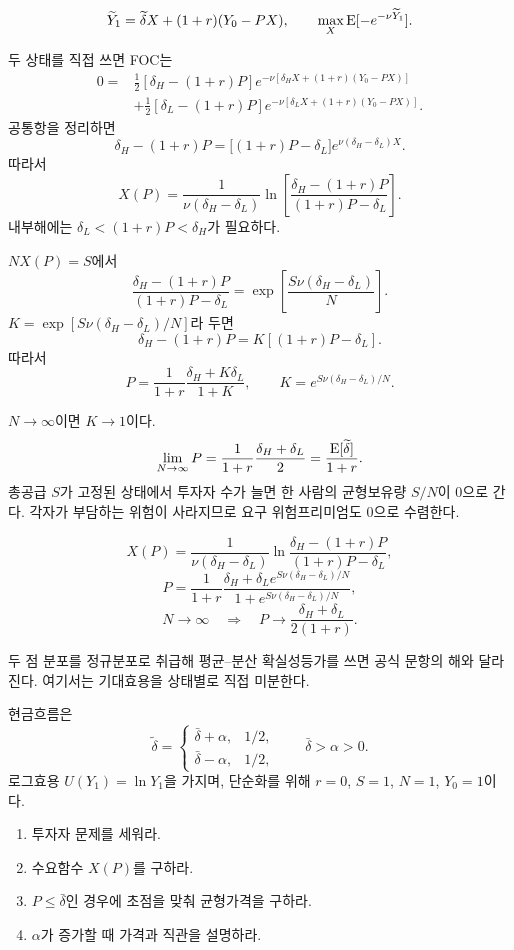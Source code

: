 \begin{solutionbox}
\[
\widetilde Y_1=\widetilde\delta X+(1+r)(Y_0-PX),
\qquad
\max_X\operatorname{E}[-e^{-\nu\widetilde Y_1}].
\]

두 상태를 직접 쓰면 FOC는
\begin{align*}
0={}&\frac12[\delta_H-(1+r)P]
 e^{-\nu[\delta_HX+(1+r)(Y_0-PX)]}\\
&+\frac12[\delta_L-(1+r)P]
 e^{-\nu[\delta_LX+(1+r)(Y_0-PX)]}.
\end{align*}
공통항을 정리하면
\[
\delta_H-(1+r)P
=\bigl[(1+r)P-\delta_L\bigr]e^{\nu(\delta_H-\delta_L)X}.
\]
따라서
\[
\boxed{X(P)=\frac1{\nu(\delta_H-\delta_L)}
\ln\left[\frac{\delta_H-(1+r)P}{(1+r)P-\delta_L}\right]}.
\]
내부해에는 $\delta_L<(1+r)P<\delta_H$가 필요하다.

$NX(P)=S$에서
\[
\frac{\delta_H-(1+r)P}{(1+r)P-\delta_L}
=\exp\left[\frac{S\nu(\delta_H-\delta_L)}{N}\right].
\]
$K=\exp[S\nu(\delta_H-\delta_L)/N]$라 두면
\[
\delta_H-(1+r)P=K[(1+r)P-\delta_L].
\]
따라서
\[
\boxed{P=\frac1{1+r}\frac{\delta_H+K\delta_L}{1+K}},
\qquad
K=e^{S\nu(\delta_H-\delta_L)/N}.
\]

$N\to\infty$이면 $K\to1$이다.
\[
\lim_{N\to\infty}P
=\frac1{1+r}\frac{\delta_H+\delta_L}{2}
=\frac{\operatorname{E}[\widetilde\delta]}{1+r}.
\]
총공급 $S$가 고정된 상태에서 투자자 수가 늘면 한 사람의 균형보유량 $S/N$이 0으로 간다. 각자가 부담하는 위험이 사라지므로 요구 위험프리미엄도 0으로 수렴한다.
\end{solutionbox}

\begin{answerbox}
\[
X(P)=\frac1{\nu(\delta_H-\delta_L)}
\ln\frac{\delta_H-(1+r)P}{(1+r)P-\delta_L},
\]
\[
P=\frac1{1+r}
\frac{\delta_H+\delta_L e^{S\nu(\delta_H-\delta_L)/N}}
{1+e^{S\nu(\delta_H-\delta_L)/N}},
\]
\[
N\to\infty\quad\Longrightarrow\quad
P\to\frac{\delta_H+\delta_L}{2(1+r)}.
\]
\end{answerbox}

\begin{warningbox}
두 점 분포를 정규분포로 취급해 평균--분산 확실성등가를 쓰면 공식 문항의 해와 달라진다. 여기서는 기대효용을 상태별로 직접 미분한다.
\end{warningbox}

\begin{officialbox}
현금흐름은
\[
\widetilde\delta=
\begin{cases}
\bar\delta+\alpha,&1/2,\\
\bar\delta-\alpha,&1/2,
\end{cases}
\qquad \bar\delta>\alpha>0.
\]
로그효용 $U(Y_1)=\ln Y_1$을 가지며, 단순화를 위해 $r=0$, $S=1$, $N=1$, $Y_0=1$이다.
\begin{enumerate}[label=(\alph*)]
\item 투자자 문제를 세워라.
\item 수요함수 $X(P)$를 구하라.
\item $P\le\bar\delta$인 경우에 초점을 맞춰 균형가격을 구하라.
\item $\alpha$가 증가할 때 가격과 직관을 설명하라.
\end{enumerate}
\end{officialbox}


